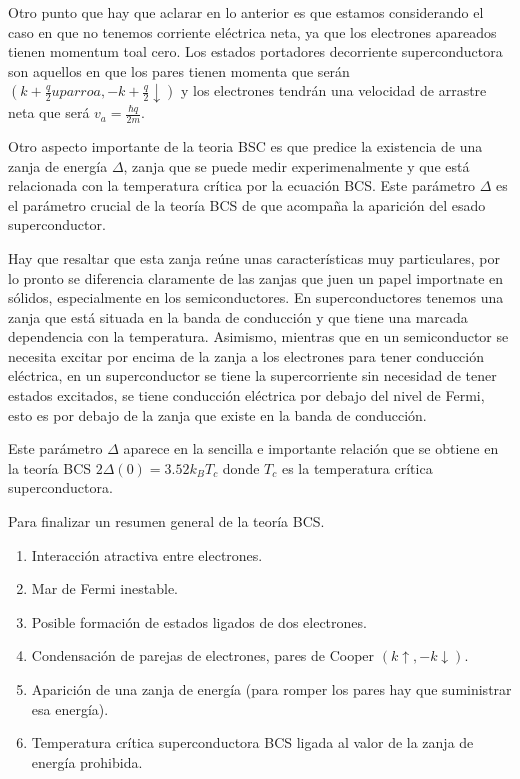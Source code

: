 Otro punto que hay que aclarar en lo anterior es que estamos considerando el caso en que no tenemos corriente eléctrica neta, ya que los electrones apareados tienen momentum toal cero. Los estados portadores  decorriente superconductora son aquellos en que los pares tienen momenta que serán $(k + \frac{q}{2} uparroa, -k + \frac{q}{2} \downarrow)$ y los electrones tendrán una velocidad de arrastre neta que será $v_a = \frac{\hbar q}{2m}$.

Otro aspecto importante de la teoria BSC es que predice la existencia de una zanja de energía $\Delta$, zanja que se puede medir experimenalmente y que está relacionada con la temperatura crítica por la ecuación BCS. Este parámetro $\Delta$ es el parámetro crucial de la teoría BCS de que acompaña la aparición del esado superconductor.

Hay que resaltar que esta zanja reúne unas características muy particulares, por lo pronto se diferencia claramente de las zanjas que juen un papel importnate en sólidos, especialmente en los semiconductores. En superconductores tenemos una zanja que está situada en la banda de conducción y que tiene una marcada dependencia con la temperatura. Asimismo, mientras que en un semiconductor se necesita excitar por encima de la zanja a los electrones para tener conducción eléctrica, en un superconductor se tiene la supercorriente sin necesidad de tener estados excitados, se tiene conducción eléctrica por debajo del nivel de Fermi, esto es por debajo de la zanja que existe en la banda de conducción.

Este parámetro $\Delta$ aparece en la sencilla e importante relación que se obtiene en la teoría BCS $2 \Delta(0) = 3.52 k_B T_c$ donde $T_c$ es la temperatura crítica superconductora.

Para finalizar un resumen general de la teoría BCS.

\begin{enumerate}
    \item Interacción atractiva entre electrones.
    \item Mar de Fermi inestable.
    \item Posible formación de estados ligados de dos electrones.
    \item Condensación de parejas de electrones, pares de Cooper $(k \uparrow, -k \downarrow)$.
    \item Aparición de una zanja de energía (para romper los pares hay que suministrar esa energía).
    \item Temperatura crítica superconductora BCS ligada al valor de la zanja de energía prohibida.
\end{enumerate}


